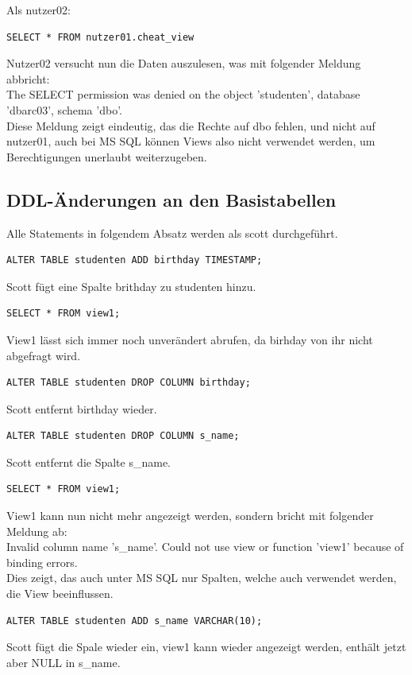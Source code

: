 \documentclass[10pt]{scrreprt}
\begin{document}
Als nutzer02:
\begin{lstlisting}[style=sql]
SELECT * FROM nutzer01.cheat_view
\end{lstlisting}
Nutzer02 versucht nun die Daten auszulesen, was mit folgender Meldung abbricht:\\
The SELECT permission was denied on the object 'studenten', database 'dbarc03', schema 'dbo'.\\
Diese Meldung zeigt eindeutig, das die Rechte auf dbo fehlen, und nicht auf nutzer01, auch bei MS SQL können Views also nicht verwendet werden, um Berechtigungen unerlaubt weiterzugeben.
\newpage
\subsection{DDL-Änderungen an den Basistabellen}
Alle Statements in folgendem Absatz werden als scott durchgeführt.
\begin{lstlisting}[style=sql]
ALTER TABLE studenten ADD birthday TIMESTAMP;
\end{lstlisting}
Scott fügt eine Spalte brithday zu studenten hinzu.

\begin{lstlisting}[style=sql]
SELECT * FROM view1;
\end{lstlisting}
View1 lässt sich immer noch unverändert abrufen, da birhday von ihr nicht abgefragt wird.

\begin{lstlisting}[style=sql]
ALTER TABLE studenten DROP COLUMN birthday;
\end{lstlisting}
Scott entfernt birthday wieder.

\begin{lstlisting}[style=sql]
ALTER TABLE studenten DROP COLUMN s_name;
\end{lstlisting}
Scott entfernt die Spalte s\_name.

\begin{lstlisting}[style=sql]
SELECT * FROM view1;
\end{lstlisting}
View1 kann nun nicht mehr angezeigt werden, sondern bricht mit folgender Meldung ab:\\
Invalid column name 's\_name'.
Could not use view or function 'view1' because of binding errors.\\
Dies zeigt, das auch unter MS SQL nur Spalten, welche auch verwendet werden, die View beeinflussen.

\begin{lstlisting}[style=sql]
ALTER TABLE studenten ADD s_name VARCHAR(10);
\end{lstlisting}
Scott fügt die Spale wieder ein, view1 kann wieder angezeigt werden, enthält jetzt aber NULL in s\_name.
\end{document}
